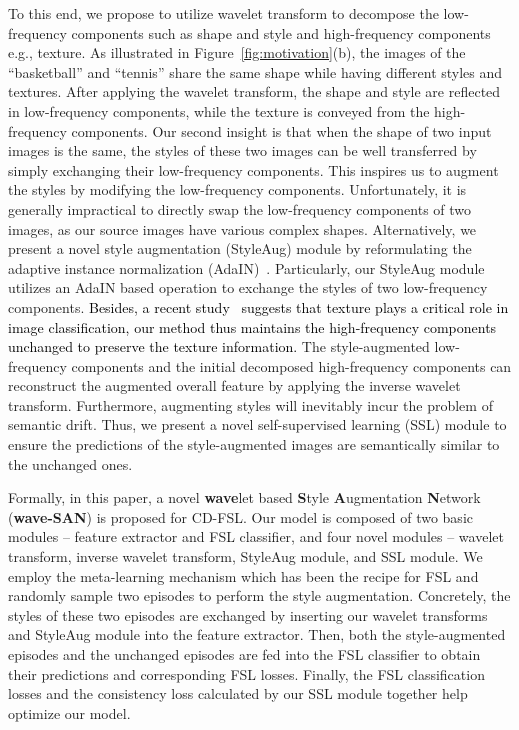 \documentclass{article}
\newcommand{\todo}{\textcolor{black}}
\begin{document}
To this end, we propose to utilize wavelet transform to decompose the low-frequency components such as shape and style and high-frequency components e.g., texture. 
As illustrated in Figure~\ref{fig:motivation}(b), the images of the ``basketball'' and  ``tennis'' share the same shape while having different styles and textures.
After applying the wavelet transform, the shape and style are reflected in low-frequency components, while the texture is conveyed from the high-frequency components. 
Our second insight is that when the shape of two input images is the same, the styles of these two images can be well transferred by simply exchanging their low-frequency components. This inspires us to augment the styles by modifying the low-frequency components. 
Unfortunately, it is generally impractical to directly swap the low-frequency components of two images, as our source images have various complex shapes. 
Alternatively, we present a novel style augmentation (StyleAug) module by reformulating the adaptive instance normalization (AdaIN)~\cite{huang2017arbitrary}. Particularly, our StyleAug module utilizes an AdaIN based operation to exchange the styles of two low-frequency components. \todo{Besides, a recent study~\cite{geirhos2018imagenet} suggests that texture plays a critical role in image classification, 
our method thus maintains the high-frequency components unchanged to preserve the texture information.}
The style-augmented low-frequency components and the initial decomposed high-frequency components can reconstruct the augmented overall feature by applying the inverse wavelet transform.
Furthermore, augmenting styles will inevitably incur the problem of semantic drift. Thus, we present a novel self-supervised learning (SSL) module to ensure the predictions of the style-augmented images are semantically similar to the unchanged ones.



Formally, in this paper, a novel \textbf{wave}let based \textbf{S}tyle \textbf{A}ugmentation \textbf{N}etwork (\textbf{wave-SAN}) is proposed for CD-FSL. Our model is composed of two basic modules -- feature extractor and FSL classifier, and four novel modules -- wavelet transform, inverse wavelet transform, StyleAug module, and SSL module. We employ the meta-learning mechanism which has been the recipe for FSL and randomly sample two episodes to perform the style augmentation. Concretely, the styles of these two episodes are exchanged by inserting our wavelet transforms and StyleAug module into the feature extractor. Then, both the style-augmented episodes and the unchanged episodes are fed into the FSL classifier to obtain their predictions and corresponding FSL losses. Finally, the FSL classification losses and the consistency loss calculated by our SSL module together help optimize our model.
\end{document}
